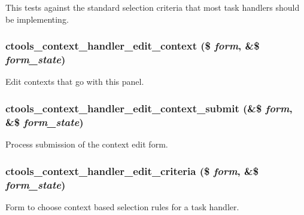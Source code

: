 This tests against the standard selection criteria that most task handlers should be implementing. \hypertarget{context-task-handler_8inc_afb5b9d894523e3e5e372405cdb0b4739}{
\subsubsection[{ctools\_\-context\_\-handler\_\-edit\_\-context}]{\setlength{\rightskip}{0pt plus 5cm}ctools\_\-context\_\-handler\_\-edit\_\-context (\$ {\em form}, \/  \&\$ {\em form\_\-state})}}
\label{context-task-handler_8inc_afb5b9d894523e3e5e372405cdb0b4739}
Edit contexts that go with this panel. \hypertarget{context-task-handler_8inc_aa62251a1beab5f93c4713a72698ce827}{
\subsubsection[{ctools\_\-context\_\-handler\_\-edit\_\-context\_\-submit}]{\setlength{\rightskip}{0pt plus 5cm}ctools\_\-context\_\-handler\_\-edit\_\-context\_\-submit (\&\$ {\em form}, \/  \&\$ {\em form\_\-state})}}
\label{context-task-handler_8inc_aa62251a1beab5f93c4713a72698ce827}
Process submission of the context edit form. \hypertarget{context-task-handler_8inc_a9cad8c277bdc4feec169f3faa96f9a41}{
\subsubsection[{ctools\_\-context\_\-handler\_\-edit\_\-criteria}]{\setlength{\rightskip}{0pt plus 5cm}ctools\_\-context\_\-handler\_\-edit\_\-criteria (\$ {\em form}, \/  \&\$ {\em form\_\-state})}}
\label{context-task-handler_8inc_a9cad8c277bdc4feec169f3faa96f9a41}
Form to choose context based selection rules for a task handler.

